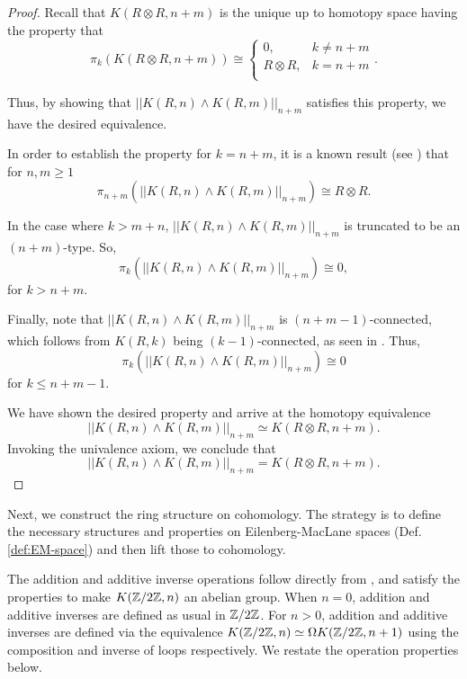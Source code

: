 \documentclass{amsart}
\begin{document}
\begin{proof}
	Recall that $K(R \otimes R, n+m)$ is the unique up to homotopy space
	having the property that
	\[
	\pi_k (K(R \otimes R, n+m )) \cong
	\begin{cases}
	0, & k \neq n+m \\
	R \otimes R, & k= n+m \\
	\end{cases}
	.\]
	
	
	Thus, by showing that $ || K(R,n) \wedge K(R,m) ||_{n+m} $
	satisfies this property, we have the desired
	equivalence. 
	
	In order to establish the property for $k=n+m$, it is a known result (see \cite[Prop 19.60]{strom:mcht}) that for $n,m\geq 1$
	\[
	\pi_{n+m} ( || K(R,n) \wedge K(R,m) ||_{n+m} )
	\cong R \otimes R.
	\]
	
	In the case where $k>m+n$, 
	 $ || K(R,n) \wedge K(R,m) ||_{n+m} $
	is truncated to be an $ ( n+m ) $-type. So, \[
	\pi_k ( || K(R,n) \wedge K(R,m) ||_{n+m} )
	\cong 0,
	\] for $k>n+m$. 
	
	Finally, note that  
	$ || K(R,n) \wedge K(R,m) ||_{n+m} $ is
	$ ( n+m-1 ) $-connected, which follows from $ K( R,k ) $ being
	$ ( k-1 ) $-connected, as seen in \cite[Prop 4.3.1]{brunerie:thesis}.
	Thus,
	\[
	\pi_k (|| K(R,n) \wedge K(R,m) ||_{n+m} ) \cong 0
	\]
	for $ k \leq n+m-1 $.
	
	We have shown the desired property and arrive at the homotopy equivalence 
	\[
	|| K(R,n) \wedge K(R,m) ||_{n+m} \simeq
	K (R \otimes R, n+m ).
	\]
	Invoking the univalence axiom, we conclude that
	\[
	|| K(R,n) \wedge K(R,m) ||_{n+m} =
	K (R \otimes R, n+m ).
	\]
\end{proof}



Next, we construct the ring structure on cohomology. The
strategy is to define the necessary structures and properties on Eilenberg-MacLane spaces (Def. \ref{def:EM-space})
and then lift those to cohomology.



The addition and additive inverse
operations follow
directly from \cite{brunerie:thesis}, and satisfy the properties to make $K(\mathbb{Z}/2\mathbb{Z},n)$ an abelian group. When $n=0$, addition and additive inverses are defined as usual in $\mathbb{Z}/2\mathbb{Z}$. For $n>0$, addition and additive inverses are defined via the equivalence $K(\mathbb{Z}/2\mathbb{Z},n)\simeq \Omega K(\mathbb{Z}/2\mathbb{Z},n+1)$ using the composition and inverse of loops respectively. We restate the operation properties below.
\end{document}
